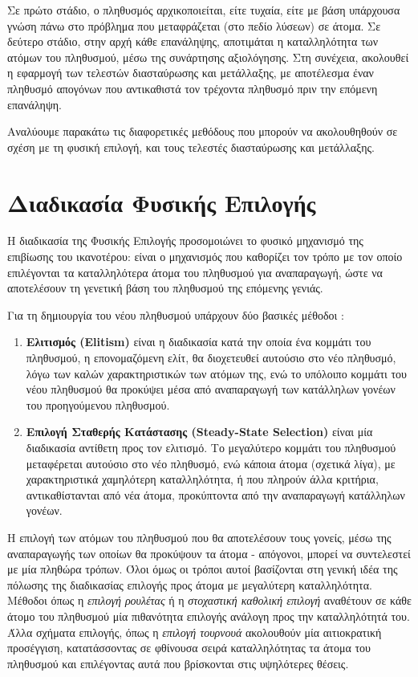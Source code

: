 Σε πρώτο στάδιο, ο πληθυσμός αρχικοποιείται, είτε τυχαία, είτε με βάση υπάρχουσα γνώση πάνω στο πρόβλημα που μεταφράζεται (στο πεδίο λύσεων) σε άτομα. Σε δεύτερο στάδιο, στην αρχή κάθε επανάληψης, αποτιμάται η καταλληλότητα των ατόμων του πληθυσμού, μέσω της συνάρτησης αξιολόγησης. Στη συνέχεια, ακολουθεί η εφαρμογή των τελεστών διασταύρωσης και μετάλλαξης, με αποτέλεσμα έναν πληθυσμό απογόνων που αντικαθιστά τον τρέχοντα πληθυσμό πριν την επόμενη επανάληψη.

Αναλύουμε παρακάτω τις διαφορετικές μεθόδους που μπορούν να ακολουθηθούν σε σχέση με τη φυσική επιλογή, και τους τελεστές διασταύρωσης και μετάλλαξης.

\section{Διαδικασία Φυσικής Επιλογής}
\label{sec:naturalSelectionProcess}
Η διαδικασία της Φυσικής Επιλογής προσομοιώνει το φυσικό μηχανισμό της επιβίωσης του ικανοτέρου: είναι ο μηχανισμός που καθορίζει τον τρόπο με τον οποίο επιλέγονται τα καταλληλότερα άτομα του πληθυσμού για αναπαραγωγή, ώστε να αποτελέσουν τη γενετική βάση του πληθυσμού της επόμενης γενιάς. 

Για τη δημιουργία του νέου πληθυσμού υπάρχουν δύο βασικές μέθοδοι \cite{buckland2002ai}:

\begin{enumerate}
\item \textbf{Ελιτισμός (Elitism)} είναι η διαδικασία κατά την οποία ένα κομμάτι του πληθυσμού, η επονομαζόμενη ελίτ, θα διοχετευθεί αυτούσιο στο νέο πληθυσμό, λόγω των καλών χαρακτηριστικών των ατόμων της, ενώ το υπόλοιπο κομμάτι του νέου πληθυσμού θα προκύψει μέσα από αναπαραγωγή των κατάλληλων γονέων του προηγούμενου πληθυσμού.
\item \textbf{Επιλογή Σταθερής Κατάστασης (Steady-State Selection)} είναι μία διαδικασία αντίθετη προς τον ελιτισμό. Το μεγαλύτερο κομμάτι του πληθυσμού μεταφέρεται αυτούσιο στο νέο πληθυσμό, ενώ κάποια άτομα (σχετικά λίγα), με χαρακτηριστικά χαμηλότερη καταλληλότητα, ή που πληρούν άλλα κριτήρια, αντικαθίστανται από νέα άτομα, προκύπτοντα από την αναπαραγωγή κατάλληλων γονέων.
\end{enumerate}

Η επιλογή των ατόμων του πληθυσμού που θα αποτελέσουν τους γονείς, μέσω της αναπαραγωγής των οποίων θα προκύψουν τα άτομα - απόγονοι, μπορεί να συντελεστεί με μία πληθώρα τρόπων. Όλοι όμως οι τρόποι αυτοί βασίζονται στη γενική ιδέα της πόλωσης της διαδικασίας επιλογής προς άτομα με μεγαλύτερη καταλληλότητα. Μέθοδοι όπως η \emph{επιλογή ρουλέτας} ή η \emph{στοχαστική καθολική επιλογή} αναθέτουν σε κάθε άτομο του πληθυσμού μία πιθανότητα επιλογής ανάλογη προς την καταλληλότητά του. Άλλα σχήματα επιλογής, όπως η \emph{επιλογή τουρνουά} ακολουθούν μία αιτιοκρατική προσέγγιση, κατατάσσοντας σε φθίνουσα σειρά καταλληλότητας τα άτομα του πληθυσμού και επιλέγοντας αυτά που βρίσκονται στις υψηλότερες θέσεις. 

